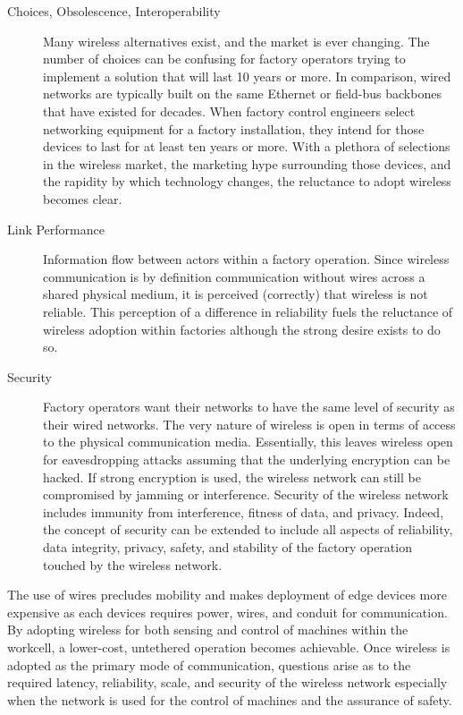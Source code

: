 \begin{description}	
	
	\item[Choices, Obsolescence, Interoperability] Many wireless alternatives exist, and the market is ever changing.  The number of choices can be confusing for factory operators trying to implement a solution that will last 10 years or more.  In comparison, wired networks are typically built on the same Ethernet or field-bus backbones that have existed for decades. When factory control engineers select networking equipment for a factory installation, they intend for those devices to last for at least ten years or more.  With a plethora of selections in the wireless market, the marketing hype surrounding those devices, and the rapidity by which technology changes, the reluctance to adopt wireless becomes clear.  
	
	\item[Link Performance] Information flow between actors within a factory operation.  Since wireless communication is by definition communication without wires across a shared physical medium, it is perceived (correctly) that wireless is not reliable.  This perception of a difference in reliability fuels the reluctance of wireless adoption within factories although the strong desire exists to do so.
	
	\item[Security] Factory operators want their networks to have the same level of security as their wired networks.  The very nature of wireless is open in terms of access to the physical communication media.  Essentially, this leaves wireless open for eavesdropping attacks assuming that the underlying encryption can be hacked.  If strong encryption is used, the wireless network can still be compromised by jamming or interference.  Security of the wireless network includes immunity from interference, fitness of data, and privacy.  Indeed, the concept of security can be extended to include all aspects of reliability, data integrity, privacy, safety, and stability of the factory operation touched by the wireless network.	
	
\end{description}

The use of wires precludes mobility and makes deployment of edge devices more expensive as each devices requires power, wires, and conduit for communication. By adopting wireless for both sensing and control of machines within the workcell, a lower-cost, untethered operation becomes achievable. Once wireless is adopted as the primary mode of communication, questions arise as to the required latency, reliability, scale, and security of the wireless network especially when the network is used for the control of machines and the assurance of safety. 

